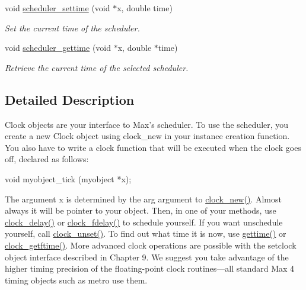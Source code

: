 \begin{DoxyCompactItemize}
void \hyperlink{group__clocks_gade0e21336c4b2f33046669df0d210a48}{scheduler\_\-settime} (void $\ast$x, double time)
\begin{DoxyCompactList}\small\item\em Set the current time of the scheduler. \item\end{DoxyCompactList}\item 
void \hyperlink{group__clocks_gadbaa75aac36f99e3559827a55c12c36e}{scheduler\_\-gettime} (void $\ast$x, double $\ast$time)
\begin{DoxyCompactList}\small\item\em Retrieve the current time of the selected scheduler. \item\end{DoxyCompactList}\end{DoxyCompactItemize}


\subsection{Detailed Description}
Clock objects are your interface to Max’s scheduler. To use the scheduler, you create a new Clock object using clock\_\-new in your instance creation function. You also have to write a clock function that will be executed when the clock goes off, declared as follows:


\begin{DoxyCode}
    void myobject_tick (myobject *x); 
\end{DoxyCode}


The argument x is determined by the arg argument to \hyperlink{group__clocks_ga6257ddd41904756699208f135f6539fd}{clock\_\-new()}. Almost always it will be pointer to your object. Then, in one of your methods, use \hyperlink{group__clocks_ga9ac56d198904627333de740743086920}{clock\_\-delay()} or \hyperlink{group__clocks_ga61719f0e0379fffbe79ae2bd5699b66f}{clock\_\-fdelay()} to schedule yourself. If you want unschedule yourself, call \hyperlink{group__clocks_ga64f5f8a027b39c1c14464744a9cc08ce}{clock\_\-unset()}. To find out what time it is now, use \hyperlink{group__clocks_gabe5d8b1c9f260d13734a328b2a60ff69}{gettime()} or \hyperlink{group__clocks_ga04a49876d29036406f857cf22b99d9ac}{clock\_\-getftime()}. More advanced clock operations are possible with the setclock object interface described in Chapter 9. We suggest you take advantage of the higher timing precision of the floating-\/point clock routines—all standard Max 4 timing objects such as metro use them.

